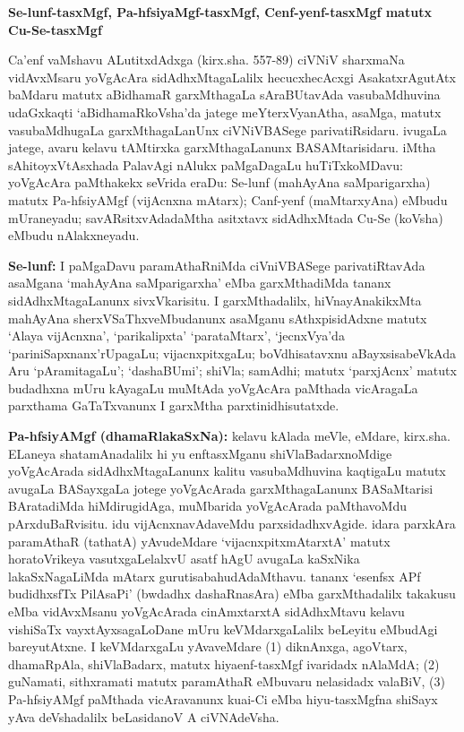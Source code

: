 \begin{center}
{\textbf{\Large Se-lunf-tasxMgf, Pa-hfsiyaMgf-tasxMgf, Cenf-yenf-tasxMgf matutx Cu-Se-tasxMgf}}
\end{center}

Ca'enf vaMshavu ALutitxdAdxga (kirx.sha. 557-89) ciVNiV sharxmaNa vidAvxMsaru yoVgA\-cAra sidAdhxMtagaLalilx hecucxhecAcxgi AsakatxrAgutAtx baMdaru matutx aBidhamaR garxMthagaLa sAraBUtavAda vasubaMdhuvina udaGxkaqti `aBidhamaRkoVsha'da jatege meYterxVyanAtha, asaMga, matutx vasubaMdhugaLa garxMthagaLanUnx ciVNiVBASege parivatiR\-sidaru. ivugaLa jatege, avaru kelavu tAMtirxka garxMthagaLanunx BASAMtarisidaru. iMtha sAhitoyxVtAsxhada PalavAgi nAlukx paMgaDagaLu huTiTxkoMDavu: yoVgAcAra paMthakekx seVrida eraDu: Se-lunf (mahAyAna saMparigarxha) matutx Pa-hfsiyAMgf (vijAcnxna mAtarx); Canf-yenf (maMtarxyAna) eMbudu mUraneyadu; savARsitx\-vAdadaMtha asitxtavx sidAdhxMtada Cu-Se (koVsha) eMbudu nAlakxneyadu.

{\bf Se-lunf:} I paMgaDavu paramAthaRniMda ciVniVBASege parivatiRtavAda asaMgana `mahAyAna saMparigarxha' eMba garxMthadiMda tananx sidAdhxMtagaLanunx sivxVkarisitu. I garxMthadalilx, hiVnayAnakikxMta mahAyAna sherxVSaThxveMbudanunx asaMganu sAthxpisidAdxne matutx `Alaya vijAcnxna', `parikalipxta' `parataMtarx', `jecnxVya'da `pariniSapxnanx'rUpagaLu; vijacnxpitxgaLu; boVdhisatavxnu aBayxsisabeVkAda Aru `pAramitagaLu'; `dashaBUmi'; shiVla; samAdhi; matutx `parxjAcnx' matutx budadhxna mUru kAyagaLu muMtAda yoVgAcAra paMthada vicAragaLa parxthama GaTaTxvanunx I garxMtha parxtinidhisutatxde.

{\bf Pa-hfsiyAMgf (dhamaRlakaSxNa):} kelavu kAlada meVle, eMdare, kirx.sha. ELaneya shatamAnadalilx hi yu enftasxMganu shiVlaBadarxnoMdige yoVgAcArada sidAdhxMta\-gaLanunx kalitu vasubaMdhuvina kaqtigaLu matutx avugaLa BASayxgaLa jotege yoVgAcArada garxMthagaLanunx BASaMtarisi BAratadiMda hiMdirugidAga, muMbarida yoVgAcArada paMtha\-voMdu pArxduBaRvisitu. idu vijAcnxnavAdaveMdu parxsidadhxvAgide. idara parxkAra para\-mAthaR (tathatA) yAvudeMdare `vijacnxpitxmAtarxtA' matutx horatoVrikeya vasutx\-gaLelalxvU asatf hAgU avugaLa kaSxNika lakaSxNagaLiMda mAtarx gurutisabahudAdaMthavu. tananx `esenfsx APf budidhxsfTx PilAsaPi' (bwdadhx dashaRnasAra) eMba garxMthadalilx takakusu eMba vidAvxMsanu yoVgAcArada cinAmxtarxtA sidAdhxMtavu kelavu vishiSaTx vayxtAyxsagaLoDane mUru keVMdarxgaLalilx beLeyitu eMbudAgi bareyutAtxne. I keVMdarxgaLu yAvaveMdare
(1) diknAnxga, agoVtarx, dhamaRpAla, shiVlaBadarx, matutx hiya{e}nf-tasxMgf ivaridadx nAlaMdA;
(2) guNamati, sithxramati matutx paramAthaR eMbuvaru nelasidadx valaBiV,
(3) Pa-hfsiyAMgf paMthada vicAravanunx kuai-Ci eMba hiyu-tasxMgfna shiSayx yAva deVshadalilx beLasidanoV A ciVNAdeVsha.


